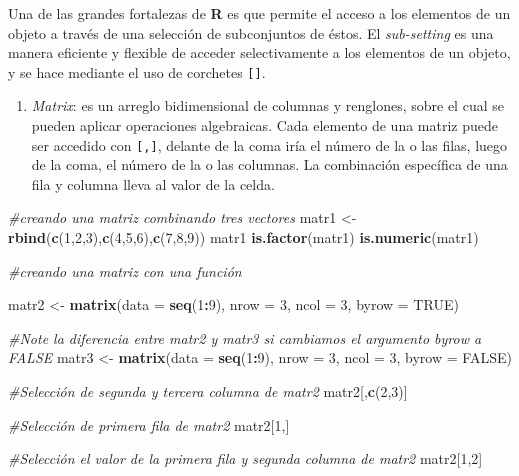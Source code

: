 \documentclass[]{article}
\newenvironment{Shaded}{\begin{snugshade}}{\end{snugshade}}
\newcommand{\CommentTok}[1]{\textcolor[rgb]{0.56,0.35,0.01}{\textit{#1}}}
\newcommand{\DataTypeTok}[1]{\textcolor[rgb]{0.13,0.29,0.53}{#1}}
\newcommand{\DecValTok}[1]{\textcolor[rgb]{0.00,0.00,0.81}{#1}}
\newcommand{\KeywordTok}[1]{\textcolor[rgb]{0.13,0.29,0.53}{\textbf{#1}}}
\newcommand{\NormalTok}[1]{#1}
\newcommand{\OperatorTok}[1]{\textcolor[rgb]{0.81,0.36,0.00}{\textbf{#1}}}
\newcommand{\OtherTok}[1]{\textcolor[rgb]{0.56,0.35,0.01}{#1}}
\newcommand{\StringTok}[1]{\textcolor[rgb]{0.31,0.60,0.02}{#1}}
\providecommand{\tightlist}{%
  \setlength{\itemsep}{0pt}\setlength{\parskip}{0pt}}
\begin{document}
Una de las grandes fortalezas de \textbf{R} es que permite el acceso a
los elementos de un objeto a través de una selección de subconjuntos de
éstos. El \emph{sub-setting} es una manera eficiente y flexible de
acceder selectivamente a los elementos de un objeto, y se hace mediante
el uso de corchetes \texttt{{[}{]}}.

\begin{enumerate}
\def\labelenumi{\Alph{enumi})}
\setcounter{enumi}{1}
\tightlist
\item
  \emph{Matrix}: es un arreglo bidimensional de columnas y renglones,
  sobre el cual se pueden aplicar operaciones algebraicas. Cada elemento
  de una matriz puede ser accedido con \texttt{{[},{]}}, delante de la
  coma iría el número de la o las filas, luego de la coma, el número de
  la o las columnas. La combinación específica de una fila y columna
  lleva al valor de la celda.
\end{enumerate}

\begin{Shaded}
\begin{Highlighting}[]
\CommentTok{#creando una matriz combinando tres vectores}
\NormalTok{matr1 <-}\StringTok{ }\KeywordTok{rbind}\NormalTok{(}\KeywordTok{c}\NormalTok{(}\DecValTok{1}\NormalTok{,}\DecValTok{2}\NormalTok{,}\DecValTok{3}\NormalTok{),}\KeywordTok{c}\NormalTok{(}\DecValTok{4}\NormalTok{,}\DecValTok{5}\NormalTok{,}\DecValTok{6}\NormalTok{),}\KeywordTok{c}\NormalTok{(}\DecValTok{7}\NormalTok{,}\DecValTok{8}\NormalTok{,}\DecValTok{9}\NormalTok{))}
\NormalTok{matr1}
\KeywordTok{is.factor}\NormalTok{(matr1)}
\KeywordTok{is.numeric}\NormalTok{(matr1)}

\CommentTok{#creando una matriz con una función}

\NormalTok{matr2 <-}\StringTok{ }\KeywordTok{matrix}\NormalTok{(}\DataTypeTok{data =} \KeywordTok{seq}\NormalTok{(}\DecValTok{1}\OperatorTok{:}\DecValTok{9}\NormalTok{), }\DataTypeTok{nrow =} \DecValTok{3}\NormalTok{, }\DataTypeTok{ncol =} \DecValTok{3}\NormalTok{, }\DataTypeTok{byrow =} \OtherTok{TRUE}\NormalTok{)}

\CommentTok{#Note la diferencia entre matr2 y matr3 si cambiamos el argumento byrow a FALSE}
\NormalTok{matr3 <-}\StringTok{ }\KeywordTok{matrix}\NormalTok{(}\DataTypeTok{data =} \KeywordTok{seq}\NormalTok{(}\DecValTok{1}\OperatorTok{:}\DecValTok{9}\NormalTok{), }\DataTypeTok{nrow =} \DecValTok{3}\NormalTok{, }\DataTypeTok{ncol =} \DecValTok{3}\NormalTok{, }\DataTypeTok{byrow =} \OtherTok{FALSE}\NormalTok{)}

\CommentTok{#Selección de segunda y tercera columna de matr2}
\NormalTok{matr2[,}\KeywordTok{c}\NormalTok{(}\DecValTok{2}\NormalTok{,}\DecValTok{3}\NormalTok{)]}

\CommentTok{#Selección de primera fila de matr2}
\NormalTok{matr2[}\DecValTok{1}\NormalTok{,]}

\CommentTok{#Selección el valor de la primera fila y segunda columna de matr2}
\NormalTok{matr2[}\DecValTok{1}\NormalTok{,}\DecValTok{2}\NormalTok{]}
\end{Highlighting}
\end{Shaded}
\end{document}
